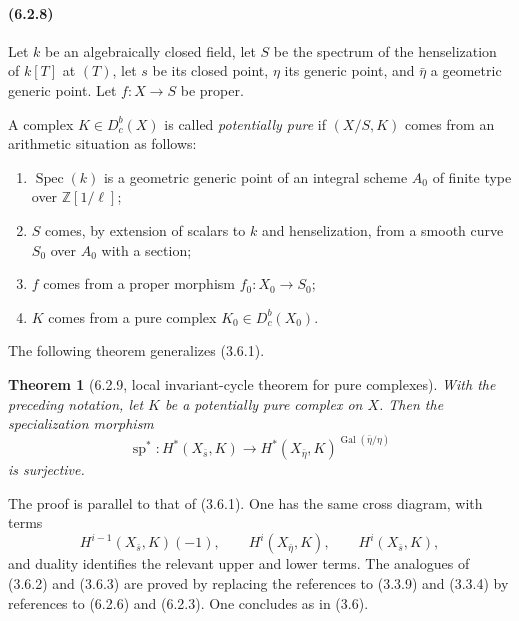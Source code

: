 \documentclass[11pt]{article}
\newtheorem{theorem}{Theorem}
\theoremstyle{remark}
\newcommand{\ZZ}{\mathbb{Z}}
\begin{document}
\paragraph{(6.2.8)}
Let \(k\) be an algebraically closed field, let \(S\) be the spectrum of the henselization of \(k[T]\) at \((T)\), let \(s\) be its closed point, \(\eta\) its generic point, and \(\bar\eta\) a geometric generic point.  Let \(f:X\to S\) be proper.

A complex \(K\in D^b_c(X)\) is called \emph{potentially pure} if \((X/S,K)\) comes from an arithmetic situation as follows:
\begin{enumerate}[label=\alph*)]
\item \(\operatorname{Spec}(k)\) is a geometric generic point of an integral scheme \(A_0\) of finite type over \(\ZZ[1/\ell]\);
\item \(S\) comes, by extension of scalars to \(k\) and henselization, from a smooth curve \(S_0\) over \(A_0\) with a section;
\item \(f\) comes from a proper morphism \(f_0:X_0\to S_0\);
\item \(K\) comes from a pure complex \(K_0\in D^b_c(X_0)\).
\end{enumerate}

The following theorem generalizes (3.6.1).

\begin{theorem}[6.2.9, local invariant-cycle theorem for pure complexes]
With the preceding notation, let \(K\) be a potentially pure complex on \(X\).  Then the specialization morphism
\[
\operatorname{sp}^*:H^*(X_{\bar s},K)\longrightarrow H^*(X_{\bar\eta},K)^{\operatorname{Gal}(\bar\eta/\eta)}
\]
is surjective.
\end{theorem}

The proof is parallel to that of (3.6.1).  One has the same cross diagram, with terms
\[
H^{i-1}(X_{\bar s},K)(-1),\qquad H^i(X_{\bar\eta},K),\qquad H^i(X_{\bar s},K),
\]
and duality identifies the relevant upper and lower terms.  The analogues of (3.6.2) and (3.6.3) are proved by replacing the references to (3.3.9) and (3.3.4) by references to (6.2.6) and (6.2.3).  One concludes as in (3.6).
\end{document}
